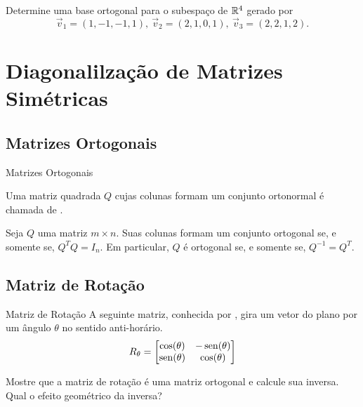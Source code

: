\begin{frame}[label=orto]{}

\begin{casa}
Determine uma base ortogonal para o subespaço de $\mathbb{R}^4$ gerado por
\[\vec{v}_1=(1,-1,-1,1),\ \vec{v}_2=(2,1,0,1),\ \vec{v}_3=(2,2,1,2).\]
\end{casa}
\end{frame}



\section{Diagonalilzação de Matrizes Simétricas}


\subsection*{Matrizes Ortogonais}
\begin{frame}[label=orto]{Matrizes Ortogonais}

\begin{defin}
Uma matriz quadrada $Q$ cujas colunas formam um conjunto ortonormal é chamada 
de .
\end{defin}

\begin{teo}
Seja $Q$ uma matriz $m\times n$. Suas colunas formam um conjunto ortogonal se, 
e somente se, $Q^TQ=I_n$. Em particular, $Q$ é ortogonal se, e somente se, $Q^{-1}=Q^T$.
\end{teo}



\end{frame}




\subsection*{Matriz de Rotação}
\begin{frame}[label=orto]{Matriz de Rotação}
A seguinte matriz, conhecida por , gira um vetor do plano por um ângulo $\theta$ no sentido anti-horário.
\[R_\theta= 
\begin{bmatrix}
\cos(\theta) & -\operatorname{sen}(\theta)\\
\operatorname{sen}(\theta) & \cos(\theta)
\end{bmatrix}
\]

\begin{exe}
Mostre que a matriz de rotação é uma matriz ortogonal e calcule sua inversa. Qual o efeito geométrico da inversa?
\end{exe}

\end{frame}

